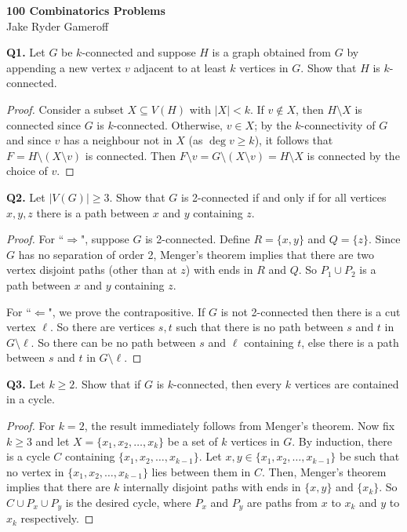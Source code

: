 \documentclass{article}
\begin{document}
\begin{center}
	\textbf{\large 100 Combinatorics Problems} \\
    \large Jake Ryder Gameroff 
\end{center}
\noindent \textbf{Q1.} Let $G$ be $k$-connected and suppose $H$ is a graph obtained from $G$ by appending a new vertex $v$ adjacent to at least $k$ vertices in $G$. Show that $H$ is $k$-connected.
\begin{proof}
Consider a subset $X \subseteq V(H)$ with $|X| < k$. If $v \notin X$, then $H \setminus X$ is connected since $G$ is $k$-connected. Otherwise, $v \in X$; by the $k$-connectivity of $G$ and since $v$ has a neighbour not in $X$ (as $\deg v \geq k$), it follows that $F = H \setminus (X \setminus v)$ is connected. Then $F \setminus v = G \setminus (X \setminus v) = H \setminus X $ is connected by the choice of $v$.
\end{proof}
\noindent \textbf{Q2.} Let \( |V(G)| \geq 3 \). Show that $G$ is 2-connected if and only if for all vertices $x,y,z$ there is a path between $x$ and $y$ containing $z$.
\begin{proof}
For ``$\Rightarrow$", suppose $G$ is 2-connected. Define \( R = \{ x,y \}  \) and \( Q = \{ z \}  \). Since \( G \) has no separation of order 2, Menger's theorem implies that there are two vertex disjoint paths (other than at \( z \)) with ends in \( R \) and \( Q \). So \( P_1 \cup P_2 \) is a path between \( x \) and \( y \) containing \( z \).

For ``$\Leftarrow$", we prove the contrapositive. If \( G \) is not 2-connected then there is a cut vertex \( \ell \). So there are vertices \( s,t \) such that there is no path between \( s \) and \( t \) in \( G \setminus \ell \). So there can be no path between \( s \) and \( \ell \) containing \( t \), else there is a path between \( s \) and \( t \) in \( G \setminus \ell \).
\end{proof}
\noindent \textbf{Q3.} Let \( k \geq 2 \). Show that if \( G \) is \( k \)-connected, then every \( k \) vertices are contained in a cycle.
\begin{proof}
	For \( k = 2 \), the result immediately follows from Menger's theorem. Now fix \( k \geq 3 \) and let \( X = \{ x_1, x_2, \hdots , x_{k}  \}  \) be a set of \( k \) vertices in \( G \). By induction, there is a cycle \( C \) containing \( \{ x_1, x_2, \hdots , x_{k-1}  \}  \). Let \( x, y \in \{ x_1, x_2, \hdots , x_{k-1}  \}  \) be such that no vertex in \( \{ x_1, x_2, \hdots , x_{k-1}  \}  \) lies between them in \( C \). Then, Menger's theorem implies that there are \( k \) internally disjoint paths with ends in \( \{ x, y \}  \) and \( \{ x_{k}  \}  \). So \( C \cup P_{x} \cup P_{y}   \) is  the desired cycle, where \( P_{x}  \) and \( P_{y}  \) are paths from \( x \) to \( x_{k}  \) and \( y \) to \( x_{k}  \) respectively.
\end{proof}
\end{document}
